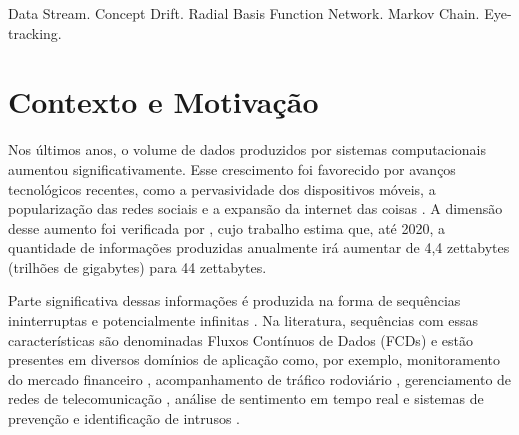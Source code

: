 \documentclass[msc, classic, a4paper]{ufbathesis}
\begin{document}
\begin{keywords}
    Data Stream. Concept Drift. Radial Basis Function Network. Markov Chain. Eye-tracking.
\end{keywords}


\tableofcontents

\listoffigures

\listoftables

\listofalgorithms

\mainmatter

% 
% 
% 
%

 \label{introducao}

\section{Contexto e Motivação}

Nos últimos anos, o volume de dados produzidos por sistemas computacionais aumentou significativamente.
%
Esse crescimento foi favorecido por avanços tecnológicos recentes, como
a pervasividade dos dispositivos móveis,
a popularização das redes sociais e
a expansão da internet das coisas \cite{Cohen:BigData:2009:MSN:1687553.1687576}.
%
A dimensão desse aumento foi verificada por ,
cujo trabalho estima que, até 2020,
a quantidade de informações produzidas anualmente irá aumentar de 4,4 zettabytes (trilhões de gigabytes) para 44 zettabytes.

Parte significativa dessas informações é produzida na forma de sequências ininterruptas e potencialmente infinitas \cite{Aggarwal:2006:DSM:1196418}.
%
Na literatura, sequências com essas características são denominadas Fluxos Contínuos de Dados (FCDs) e estão presentes em diversos domínios de aplicação como, por exemplo, monitoramento do mercado financeiro \cite{ZHOU:2015},
acompanhamento de tráfico rodoviário \cite{Wang:2015:EOV:2843092.2843464},
gerenciamento de redes de telecomunicação \cite{delattre2015method},
análise de sentimento em tempo real \cite{KRANJC2015187} e
sistemas de prevenção e identificação de intrusos \cite{KENKRE:PAI:COLACO:2015}.
\end{document}
